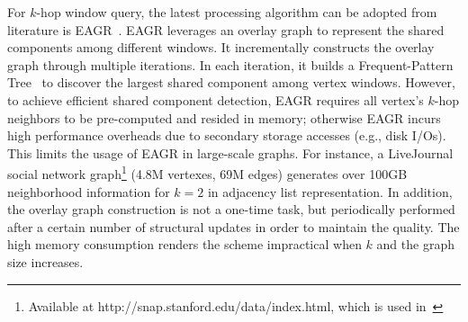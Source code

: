 For $k$-hop window query, 
the latest processing algorithm can be adopted from literature is EAGR~\cite{mondal2014eagr}.
%
EAGR leverages an overlay graph to represent the shared
components among different windows. It incrementally constructs the overlay graph
through multiple iterations. In each iteration, it builds a Frequent-Pattern Tree~\cite{han2004mining}
to discover the largest shared component among vertex windows. However,
to achieve efficient shared component detection, EAGR requires all
vertex's $k$-hop neighbors to be pre-computed and resided in memory; otherwise
EAGR incurs high performance overheads due to secondary storage accesses (e.g., disk I/Os).
This limits the usage of EAGR in large-scale graphs. 
For instance, a LiveJournal social network graph\footnote{Available at http://snap.stanford.edu/data/index.html, which is used in~\cite{mondal2014eagr}} 
(4.8M vertexes, 69M edges) generates over 100GB neighborhood information 
for $k=2$ in adjacency list representation. 
In addition, the overlay graph construction is not a one-time task,
but periodically performed after a certain number of structural updates 
in order to maintain the quality. 
The high memory consumption renders the scheme impractical when $k$ and the graph size increases.


